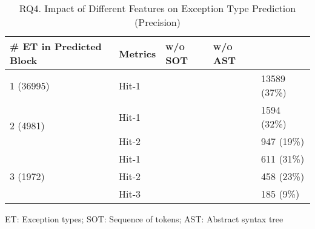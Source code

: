 \begin{table}[t]
	\caption{RQ4. Impact of Different Features on Exception Type Prediction (Precision)}
	\vspace{-10pt}
	\tabcolsep 2pt
	{\small
		\begin{center}
			\renewcommand{\arraystretch}{1}
			\begin{tabular}{p{2cm}<{\centering}|p{1cm}<{\centering}|p{1.5cm}<{\centering}|p{1.5cm}<{\centering}|p{1.5cm}<{\centering}}
				\hline
				\# ET in Predicted Block & Metrics &{\textsc{\tool w/o SOT}\xspace}&{\textsc{\tool w/o AST}\xspace}& {\textsc{\tool}\xspace} \\
				\hline
				\multirow{1}{*}{1 (36995)}   & Hit-1  &&& 13589 (37\%) \\
				\hline
				\multirow{2}{*}{2 (4981)}  & Hit-1   &&& 1594 (32\%) \\
				& Hit-2       						&&& 947 (19\%) \\
				\hline
				\multirow{3}{*}{3 (1972)}  & Hit-1   && & 611 (31\%) \\
				& Hit-2         					&&& 458 (23\%)\\
				& Hit-3         				  	&&& 185 (9\%) \\
				\hline
			\end{tabular}
		ET: Exception types; SOT: Sequence of tokens; AST: Abstract syntax tree
			\label{RQ4_results_3}
		\end{center}
	}
\end{table}

{\color{red}{Without sequence of tokens or AST in exception type prediction will lead to the reduce of results of all hit-1, hit-2, and hit-3. Once I finish this sensitivity experiments, I will update these two table. }}


